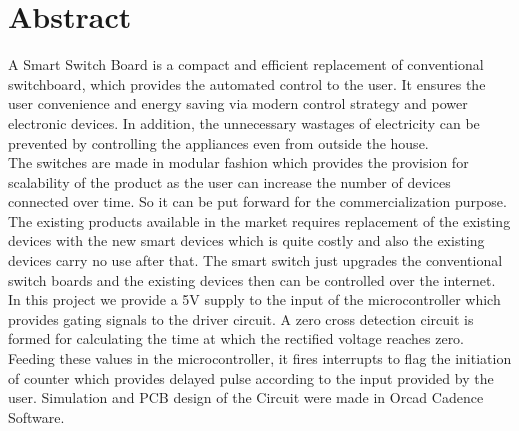 \chapter*{Abstract}
    
    A Smart Switch Board is a compact and efficient replacement of conventional switchboard, which provides the automated control to the user. It ensures the user convenience and energy saving via modern control strategy and power electronic devices. In addition, the unnecessary wastages of electricity can be prevented by controlling the appliances even from outside the house.\\
    
    The switches are made in modular fashion which provides the provision for scalability of the product as the user can increase the number of devices connected over time.  So it can be put forward for the commercialization purpose.\\
    
    The existing products available in the market requires replacement of the existing devices with the new smart devices which is quite costly and also the existing devices carry no use after that. The smart switch just upgrades the conventional switch boards and the existing devices then can be controlled over the internet.\\
    
    In this project we provide a 5V supply to the input of the microcontroller which provides gating signals to the driver circuit. A zero cross detection circuit is formed for calculating the time at which the rectified voltage reaches zero. Feeding these values in the microcontroller, it fires interrupts to flag the initiation of counter which provides delayed pulse according to the input provided by the user. Simulation and PCB design of the Circuit were made in Orcad Cadence Software.\\
    
    